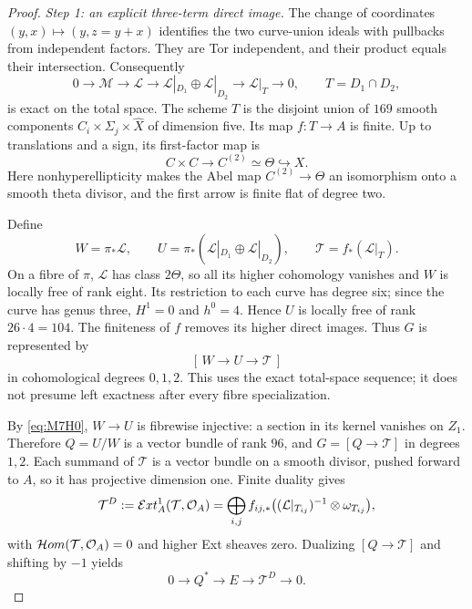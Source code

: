 \begin{proof}
\emph{Step 1: an explicit three-term direct image.}
The change of coordinates $(y,x)\mapsto(y,z=y+x)$ identifies the two
curve-union ideals with pullbacks from independent factors. They are Tor
independent, and their product equals their intersection. Consequently
\[
 0\longrightarrow\mathcal M\longrightarrow\mathcal L
 \longrightarrow\mathcal L|_{D_1}\oplus\mathcal L|_{D_2}
 \longrightarrow\mathcal L|_T\longrightarrow0,
 \qquad T=D_1\cap D_2,
\]
is exact on the total space. The scheme $T$ is the disjoint union of
$169$ smooth components $C_i\times\Sigma_j\times\widehat X$ of dimension
five. Its map $f:T\to A$ is finite. Up to translations and a sign, its
first-factor map is
\[
 C\times C\longrightarrow C^{(2)}\simeq\Theta\hookrightarrow X.
\]
Here nonhyperellipticity makes the Abel map $C^{(2)}\to\Theta$ an
isomorphism onto a smooth theta divisor, and the first arrow is finite
flat of degree two.

Define
\[
 W=\pi_*\mathcal L,\qquad
 U=\pi_*(\mathcal L|_{D_1}\oplus\mathcal L|_{D_2}),\qquad
 \mathcal T=f_*(\mathcal L|_T).
\]
On a fibre of $\pi$, $\mathcal L$ has class $2\Theta$, so all its higher
cohomology vanishes and $W$ is locally free of rank eight. Its restriction
to each curve has degree six; since the curve has genus three,
$H^1=0$ and $h^0=4$. Hence $U$ is locally free of rank $26\cdot4=104$.
The finiteness of $f$ removes its higher direct images. Thus $G$ is
represented by
\[
 [\,W\longrightarrow U\longrightarrow\mathcal T\,]
\]
in cohomological degrees $0,1,2$. This uses the exact total-space
sequence; it does not presume left exactness after every fibre
specialization.

By \eqref{eq:M7H0}, $W\to U$ is fibrewise injective: a section in its
kernel vanishes on $Z_1$. Therefore $Q=U/W$ is a vector bundle of rank
$96$, and $G=[Q\to\mathcal T]$ in degrees $1,2$.
Each summand of $\mathcal T$ is a vector bundle on a smooth divisor,
pushed forward to $A$, so it has projective dimension one. Finite
duality gives
\[
 \mathcal T^D:=\mathcal E xt^1_A(\mathcal T,\mathcal O_A)
 =\bigoplus_{i,j}f_{ij,*}
       \bigl((\mathcal L|_{T_{ij}})^{-1}\otimes\omega_{T_{ij}}\bigr),
\]
with $\mathcal H om(\mathcal T,\mathcal O_A)=0$ and higher Ext sheaves zero.
Dualizing $[Q\to\mathcal T]$ and shifting by $-1$ yields
\begin{equation}\label{eq:M7extension}
 0\longrightarrow Q^*\longrightarrow E
          \longrightarrow\mathcal T^D\longrightarrow0.
\end{equation}


\end{proof}
